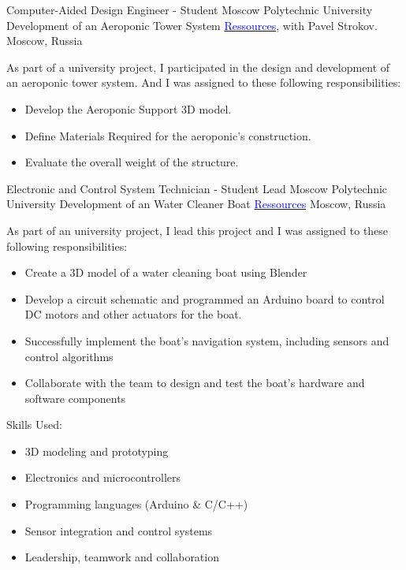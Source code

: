 \vspace{2mm}

    {Computer-Aided Design Engineer - Student}
    {Moscow Polytechnic University}
    {
    \newline
    Development of an Aeroponic Tower System
    \href{https://drive.google.com/drive/folders/1GYReOb4vYT3_jlym9ULB7Yud_lAxtPxk}{\textcolor{blue}{Ressources}}, with Pavel Strokov.
    }
    {Moscow, Russia}
    {
    As part of a university project, I participated in the design and development of an aeroponic tower system. And I was assigned to these following responsibilities:
    \begin{itemize}
        \item Develop the Aeroponic Support 3D model.
        \item Define Materials Required for the aeroponic's construction.
        \item Evaluate the overall weight of the structure.
    \end{itemize}
    }

\vspace{1mm}

    {Electronic and Control System Technician - Student Lead}
    {Moscow Polytechnic University}
    {
    \newline
    Development of an Water Cleaner Boat
    \href{https://github.com/DanGlChris/Water-cleaning-boat}{\textcolor{blue}{Ressources}}}
    {Moscow, Russia}
    {
    As part of an university project, I lead this project and I was assigned to these following responsibilities:
    \vspace{1mm}
    \begin{itemize}
        \item Create a 3D model of a water cleaning boat using Blender
        \item Develop a circuit schematic and programmed an Arduino board to control DC motors and other actuators for the boat.
        \item Successfully implement the boat's navigation system, including sensors and control algorithms
        \item Collaborate with the team to design and test the boat's hardware and software components
    \end{itemize}
    \vspace{1mm}
    Skills Used:
    \begin{itemize}
        \item 3D modeling and prototyping
        \item Electronics and microcontrollers
        \item Programming languages (Arduino \& C/C++)
        \item Sensor integration and control systems
        \item Leadership, teamwork and collaboration
    \end{itemize}
    }
\newpage
